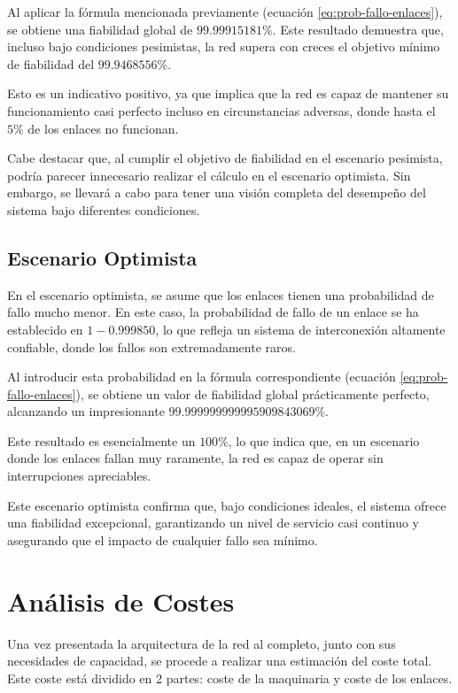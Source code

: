 \documentclass[%
    school=etsisi,%
    degree=61TI,%
]{upm-report}
\begin{document}
Al aplicar la fórmula mencionada previamente (ecuación \ref{eq:prob-fallo-enlaces}), se obtiene una fiabilidad global de $99.99915181\%$. Este resultado demuestra que, incluso bajo condiciones pesimistas, la red supera con creces el objetivo mínimo de fiabilidad del $99.9468556\%$. 

Esto es un indicativo positivo, ya que implica que la red es capaz de mantener su funcionamiento casi perfecto incluso en circunstancias adversas, donde hasta el $5\%$ de los enlaces no funcionan.

Cabe destacar que, al cumplir el objetivo de fiabilidad en el escenario pesimista, podría parecer innecesario realizar el cálculo en el escenario optimista. Sin embargo, se llevará a cabo para tener una visión completa del desempeño del sistema bajo diferentes condiciones.

\subsection{Escenario Optimista}
\label{subsec:escenario-optimista}


En el escenario optimista, se asume que los enlaces tienen una probabilidad de fallo mucho menor. En este caso, la probabilidad de fallo de un enlace se ha establecido en $1 - 0.999850$, lo que refleja un sistema de interconexión altamente confiable, donde los fallos son extremadamente raros.

Al introducir esta probabilidad en la fórmula correspondiente (ecuación \ref{eq:prob-fallo-enlaces}), se obtiene un valor de fiabilidad global prácticamente perfecto, alcanzando un impresionante $99.999999999995909843069\%$. 

Este resultado es esencialmente un $100\%$, lo que indica que, en un escenario donde los enlaces fallan muy raramente, la red es capaz de operar sin interrupciones apreciables.

Este escenario optimista confirma que, bajo condiciones ideales, el sistema ofrece una fiabilidad excepcional, garantizando un nivel de servicio casi continuo y asegurando que el impacto de cualquier fallo sea mínimo.

\section{Análisis de Costes}
\label{sec:análisis-costes}

Una vez presentada la arquitectura de la red al completo, junto con sus necesidades de capacidad, se procede a realizar una estimación del coste total. Este coste está dividido en 2 partes: coste de la maquinaria y coste de los enlaces.
\end{document}
